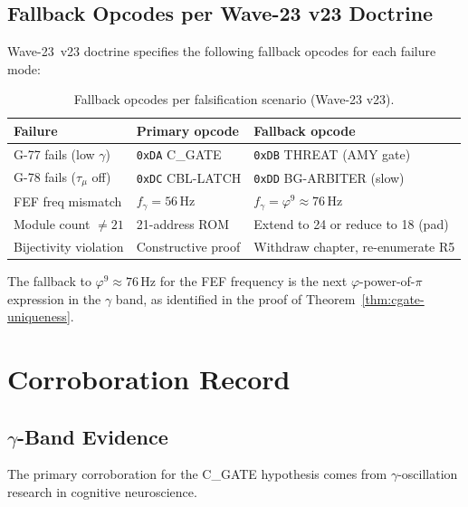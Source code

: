 \subsection{Fallback Opcodes per Wave-23 v23 Doctrine}
\label{sec:73:fallback}

Wave-23~v23 doctrine specifies the following fallback opcodes
for each failure mode:

\begin{table}[H]
\centering
\caption{Fallback opcodes per falsification scenario (Wave-23 v23).}
\label{tab:73:fallback}
\small
\begin{tabular}{lll}
\toprule
Failure & Primary opcode & Fallback opcode \\
\midrule
G-77 fails (low $\gamma$)   & \texttt{0xDA} C\_GATE   & \texttt{0xDB} THREAT (AMY gate)     \\
G-78 fails ($\tau_\mu$ off) & \texttt{0xDC} CBL-LATCH & \texttt{0xDD} BG-ARBITER (slow)     \\
FEF freq mismatch           & $f_\gamma=56\,\text{Hz}$ & $f_\gamma = \varphi^9\approx76\,\text{Hz}$ \\
Module count $\neq 21$      & 21-address ROM          & Extend to 24 or reduce to 18 (pad)  \\
Bijectivity violation       & Constructive proof      & Withdraw chapter, re-enumerate R5   \\
\bottomrule
\end{tabular}
\end{table}

The fallback to $\varphi^{9} \approx 76\,\mathrm{Hz}$ for the FEF
frequency is the next $\varphi$-power-of-$\pi$ expression in the
$\gamma$ band, as identified in the proof of
Theorem~\ref{thm:cgate-uniqueness}.

\section{Corroboration Record}
\label{sec:73:corroboration}

\subsection{$\gamma$-Band Evidence}
\label{sec:73:corr-gamma}

The primary corroboration for the C\_GATE hypothesis comes from
$\gamma$-oscillation research in cognitive neuroscience.

